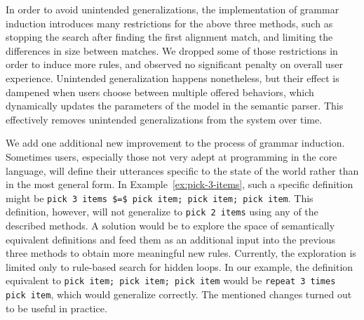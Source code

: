 %
In order to avoid unintended generalizations, the implementation
of grammar induction introduces many restrictions for the above three methods, 
such as stopping the search after finding the
first alignment match, and limiting the differences in size between matches.
We dropped some of those restrictions in order to induce more rules,
and observed no significant penalty on overall user experience.
Unintended generalization happens nonetheless, but their effect is dampened when
users choose between multiple offered behaviors, which dynamically updates the
parameters of the model in the semantic parser.
This effectively removes unintended generalizations from the system over time.

We add one additional new improvement to the process of grammar induction.
Sometimes users, especially those not very adept at programming in the core
language, will define their utterances specific to the state of the world rather
than in the most general form.
In Example~\ref{ex:pick-3-items}, such a specific definition might be
\lstinline{pick 3 items $=$ pick item; pick item; pick item}. This definition,
however, will not generalize to
\lstinline{pick 2 items} using any of the described methods.
A solution would be to explore the space of semantically equivalent definitions and feed them as an additional
input into the previous three methods to obtain more meaningful new rules.
Currently, the exploration is limited only to rule-based search for hidden loops. In our
example, the definition equivalent to \lstinline{pick item; pick item; pick item}
would be \lstinline{repeat 3 times pick item}, which would generalize
correctly. The mentioned changes turned out to be useful in practice.
